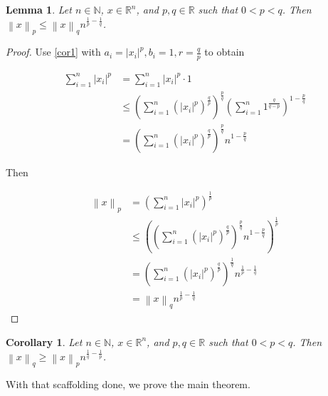 \documentclass[11pt]{amsart}
\newtheorem{lemma}[theorem]{Lemma}
\newtheorem{corollary}[theorem]{Corollary}
\newcommand{\norm}[1]{\left\lVert #1 \right\rVert}
\begin{document}
\begin{lemma}\label{lem1}
Let $n \in \mathbb{N}$, $x \in \mathbb{R}^n$, and $p, q \in \mathbb{R}$ such that $0 < p < q$. Then $\norm{x}_p \le \norm{x}_q n^{\frac{1}{p} - \frac{1}{q}}$.
\end{lemma}
\begin{proof}
Use \ref{cor1} with $a_i = |x_i|^p, b_i = 1, r = \frac{q}{p}$ to obtain

\begin{align*}
\sum_{i = 1}^n |x_i|^p &= \sum_{i = 1}^n |x_i|^p \cdot 1\\
                       &\le \left(\sum_{i=1}^n \left(|x_i|^p\right)^{\frac{q}{p}}\right)^{\frac{p}{q}} \left(\sum_{i=1}^n 1^{\frac{q}{q-p}}\right)^{1 - \frac{p}{q}}\\
                       &= \left(\sum_{i=1}^n \left(|x_i|^p\right)^{\frac{q}{p}}\right)^{\frac{p}{q}} n^{1 - \frac{p}{q}}
\end{align*}

Then

\begin{align*}
\norm{x}_p &= \left(\sum_{i=1}^n |x_i|^p \right)^{\frac{1}{p}}\\
           &\le \left(\left(\sum_{i=1}^n \left(|x_i|^p\right)^{\frac{q}{p}}\right)^{\frac{p}{q}} n^{1 - \frac{p}{q}}\right)^{\frac{1}{p}}\\
           &= \left(\sum_{i=1}^n \left(|x_i|^p\right)^{\frac{q}{p}}\right)^{\frac{1}{q}} n^{\frac{1}{p} - \frac{1}{q}}\\
           &= \norm{x}_q n^{\frac{1}{p} - \frac{1}{q}}
\end{align*}
\end{proof}

\begin{corollary}\label{cor2}
Let $n \in \mathbb{N}$, $x \in \mathbb{R}^n$, and $p, q \in \mathbb{R}$ such that $0 < p < q$. Then $\norm{x}_q \ge \norm{x}_p n^{\frac{1}{q} - \frac{1}{p}}$.
\end{corollary}

With that scaffolding done, we prove the main theorem.
\end{document}
